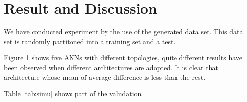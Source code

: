 \section{Result and Discussion}
We have conducted experiment by the use of the generated data set. This data
set is randomly partitoned into a training set and a test.

Figure \ref{fig:train-process} shows five ANNs with different topologies, quite
different results have been observed when different architectures are adopted.
It is clear that architecture whose mean of average difference is less than the
rest.


\begin{figure}
	\centering
	\def\svgwidth{\columnwidth}
	
	\label{fig:train-process}
\end{figure}

Table \ref{tab:simu} shows part of the valudation.







